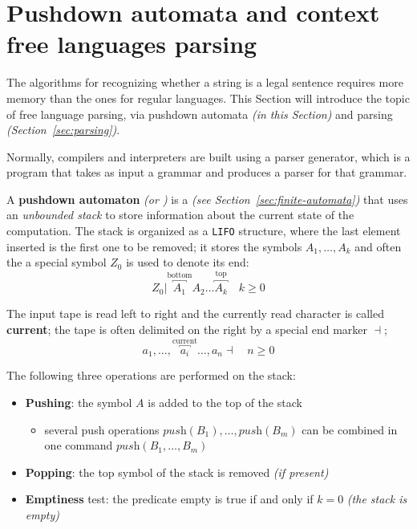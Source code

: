 \documentclass[english]{article}
\begin{document}
\clearpage

\section{Pushdown automata and context free languages parsing}

The algorithms for recognizing whether a string is a legal sentence requires more memory than the ones for regular languages.
This Section will introduce the topic of free language parsing, via pushdown automata \textit{(in this Section)} and parsing \textit{(Section~\ref{sec:parsing})}.

Normally, compilers and interpreters are built using a parser generator, which is a program that takes as input a grammar and produces a parser for that grammar.

\bigskip
A \textbf{pushdown automaton} \textit{(or \PDA)} is a \FSA \textit{(see Section~\ref{sec:finite-automata})} that uses an \textit{unbounded stack} to store information about the current state of the computation.
The stack is organized as a \texttt{LIFO} structure, where the last element inserted is the first one to be removed;
it stores the symbols \(A_1, \ldots, A_k\) and often the a special symbol \(Z_0\) is used to denote its end:
\[ Z_0 \vert \overbracket{A_1}^\text{bottom} A_2 \ldots \overbracket{A_k}^\text{top} \quad k \geq 0\]

The input tape is read left to right and the currently read character is called \textbf{current}; the tape is often delimited on the right by a special end marker \(\dashv\);
\[ a_1, \ldots, \overbracket{a_i}^{\text{current}} \ldots, a_n \dashv \quad n \geq 0 \]

The following three operations are performed on the stack:

\begin{itemize}
  \item \textbf{Pushing}: the symbol \(A\) is added to the top of the stack
        \begin{itemize}[label=\(\rightarrow\)]
          \item several push operations \(\textit{push}(B_1), \ldots, \textit{push}(B_m)\) can be combined in one command \(\textit{push}(B_1, \ldots, B_m)\)
        \end{itemize}
  \item \textbf{Popping}: the top symbol of the stack is removed \textit{(if present)}
  \item \textbf{Emptiness} test: the predicate empty is true if and only if \(k=0\) \textit{(the stack is empty)}
\end{itemize}
\end{document}

